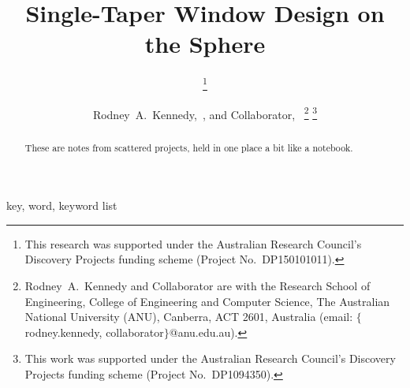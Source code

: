 \documentclass[10pt, twocolumn, twoside]{IEEEtran}
\begin{document}
\title{Single-Taper Window Design on the Sphere}

\ifCLASSOPTIONconference
	\author{
			\thanks{This research was supported under the Australian Research Council's Discovery Projects
				funding scheme (Project No.~DP150101011).}
		 \and
		}
\else
	\author{Rodney~A.~Kennedy,~, and
		Collaborator,~
		\thanks{Rodney~A.~Kennedy and Collaborator are with the Research School of Engineering,
			College of Engineering and Computer Science,
			The Australian National University (ANU), Canberra, ACT 2601, Australia
			(email: $\{$rodney.kennedy, collaborator$\}$@anu.edu.au).}
		\thanks{This work was supported under the Australian Research Council's Discovery Projects
			funding scheme (Project No.~DP1094350).}}
\fi


\maketitle

\newcommand{\R}{\mathscr{R}}
\newcommand{\taper}{w}%

\newcommand{\chfn}{\chi_{\R}^{\vphantom{g}}}

\begin{abstract}
These are notes from scattered projects, held in one place a bit like a notebook.
\end{abstract}

\smallskip
\begin{IEEEkeywords}
key, word, keyword list
\end{IEEEkeywords}
\end{document}
